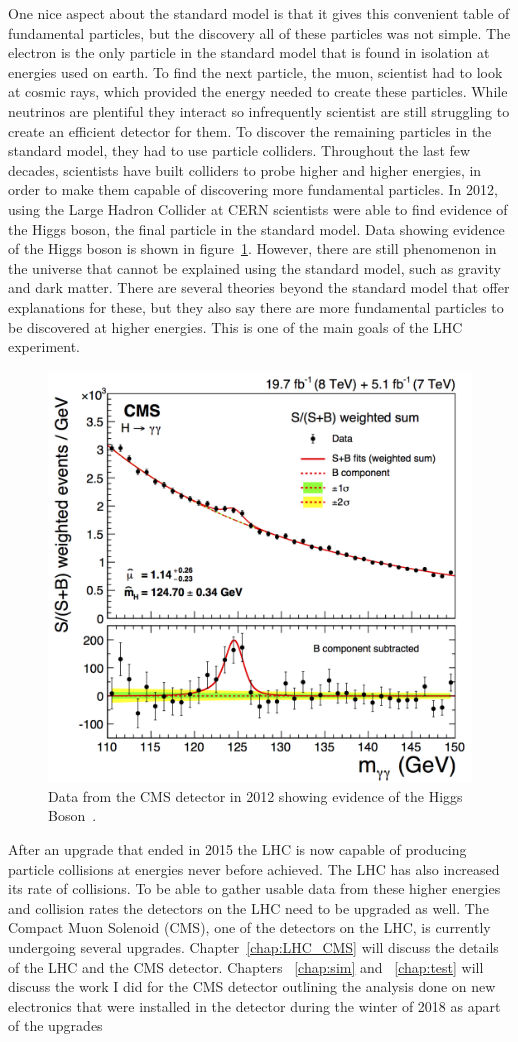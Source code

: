 One nice aspect about the standard model is that it gives this convenient table of fundamental particles, but the discovery all of these particles was not simple. The electron is the only particle in the standard model that is found in isolation at energies used on earth. To find the next particle, the muon, scientist had to look at cosmic rays, which provided the energy needed to create these particles. While neutrinos are plentiful they interact so infrequently scientist are still struggling to create an efficient detector for them. To discover the remaining particles in the standard model, they had to use particle colliders. Throughout the last few decades, scientists have built colliders to probe higher and higher energies, in order to make them capable of discovering more fundamental particles. In 2012, using the Large Hadron Collider at CERN scientists were able to find evidence of the Higgs boson, the final particle in the standard model. Data showing evidence of the Higgs boson is shown in figure~\ref{fig:higgs}. However, there are still phenomenon in the universe that cannot be explained using the standard model, such as gravity and dark matter. There are several theories beyond the standard model that offer explanations for these, but they also say there are more fundamental particles to be discovered at higher energies. This is one of the main goals of the LHC experiment. 

\begin{figure}
\centering
\includegraphics[width=0.6\linewidth]{Figures/higgsmeasurement.png}
\caption{Data from the CMS detector in 2012 showing evidence of the Higgs Boson~\cite{CMS_Higgs_Discovery}.}
\label{fig:higgs}
\end{figure} 


After an upgrade that ended in 2015 the LHC is now capable of producing particle collisions at energies never before achieved. The LHC has also increased its rate of collisions. To be able to gather usable data from these higher energies and collision rates the detectors on the LHC need to be upgraded as well. The Compact Muon Solenoid (CMS), one of the detectors on the LHC, is currently undergoing several upgrades. Chapter~\ref{chap:LHC_CMS} will discuss the details of the LHC and the CMS detector. Chapters ~\ref{chap:sim} and ~\ref{chap:test} will discuss the work I did for the CMS detector outlining the analysis done on new electronics that were installed in the detector during the winter of 2018 as apart of the upgrades

